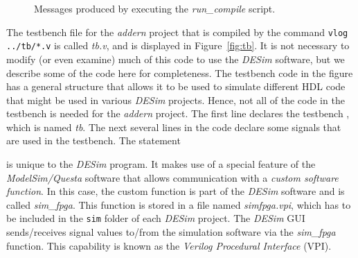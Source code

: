 \begin{figure}[h]
	\begin{center}
        \setlength{\fboxsep}{0pt}
	\end{center}
          \caption{Messages produced by executing the {\it run\_compile} script.}
	\label{fig:compile}
\end{figure}

\newpage
The testbench file for the {\it addern} project that is compiled by the command 
\texttt{vlog ../tb/*.v} is called {\it tb.v}, and is displayed in Figure~\ref{fig:tb}. 
It is not necessary to modify (or even examine) much of this code to use the {\it
DESim} software, but we describe some of the code here for completeness.
The testbench code in the figure has a general structure that 
allows it to be used to simulate different HDL code
that might be used in various {\it DESim} projects. Hence, not
all of the code in the testbench is needed for the {\it addern} project.  The first line 
declares the testbench \hdlModuleName, which is named {\it tb}. 
The next several lines in the code declare some signals that are used in the testbench. 
The statement



is unique to the {\it DESim} program. It makes use of a special feature of the
{\it ModelSim/Questa} software that allows communication with a 
{\it custom software function}. In this case, the custom function is part of the {\it DESim} 
software and is called {\it sim\_fpga}. This function is stored in a file named {\it simfpga.vpi}, 
which has to be included in the \texttt{sim} folder of each {\it DESim} project. The {\it DESim} 
GUI sends/receives signal values to/from the simulation software via the {\it sim\_fpga} function. 
This capability is known as the {\it Verilog Procedural Interface} (VPI). 

